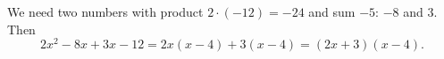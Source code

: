 We need two numbers with product $2\cdot(-12)=-24$ and sum $-5$: $-8$ and $3$. Then
\[2x^2-8x+3x-12=2x(x-4)+3(x-4)=\boxed{(2x+3)(x-4)}.\]
